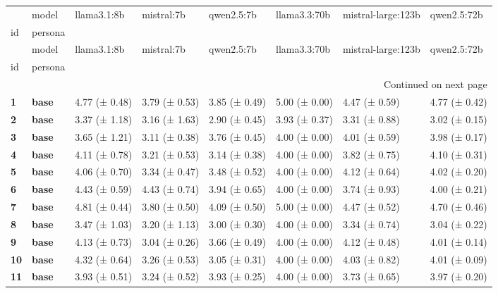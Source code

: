 \begin{longtable}{llllllll}
\toprule
 & model & llama3.1:8b & mistral:7b & qwen2.5:7b & llama3.3:70b & mistral-large:123b & qwen2.5:72b \\
id & persona &  &  &  &  &  &  \\
\midrule
\endfirsthead
\toprule
 & model & llama3.1:8b & mistral:7b & qwen2.5:7b & llama3.3:70b & mistral-large:123b & qwen2.5:72b \\
id & persona &  &  &  &  &  &  \\
\midrule
\endhead
\midrule
\multicolumn{8}{r}{Continued on next page} \\
\midrule
\endfoot
\bottomrule
\endlastfoot
\textbf{1} & \textbf{base} & 4.77 (± 0.48) & 3.79 (± 0.53) & 3.85 (± 0.49) & 5.00 (± 0.00) & 4.47 (± 0.59) & 4.77 (± 0.42) \\
\cline{1-8}
\textbf{2} & \textbf{base} & 3.37 (± 1.18) & 3.16 (± 1.63) & 2.90 (± 0.45) & 3.93 (± 0.37) & 3.31 (± 0.88) & 3.02 (± 0.15) \\
\cline{1-8}
\textbf{3} & \textbf{base} & 3.65 (± 1.21) & 3.11 (± 0.38) & 3.76 (± 0.45) & 4.00 (± 0.00) & 4.01 (± 0.59) & 3.98 (± 0.17) \\
\cline{1-8}
\textbf{4} & \textbf{base} & 4.11 (± 0.78) & 3.21 (± 0.53) & 3.14 (± 0.38) & 4.00 (± 0.00) & 3.82 (± 0.75) & 4.10 (± 0.31) \\
\cline{1-8}
\textbf{5} & \textbf{base} & 4.06 (± 0.70) & 3.34 (± 0.47) & 3.48 (± 0.52) & 4.00 (± 0.00) & 4.12 (± 0.64) & 4.02 (± 0.20) \\
\cline{1-8}
\textbf{6} & \textbf{base} & 4.43 (± 0.59) & 4.43 (± 0.74) & 3.94 (± 0.65) & 4.00 (± 0.00) & 3.74 (± 0.93) & 4.00 (± 0.21) \\
\cline{1-8}
\textbf{7} & \textbf{base} & 4.81 (± 0.44) & 3.80 (± 0.50) & 4.09 (± 0.50) & 5.00 (± 0.00) & 4.47 (± 0.52) & 4.70 (± 0.46) \\
\cline{1-8}
\textbf{8} & \textbf{base} & 3.47 (± 1.03) & 3.20 (± 1.13) & 3.00 (± 0.30) & 4.00 (± 0.00) & 3.34 (± 0.74) & 3.04 (± 0.22) \\
\cline{1-8}
\textbf{9} & \textbf{base} & 4.13 (± 0.73) & 3.04 (± 0.26) & 3.66 (± 0.49) & 4.00 (± 0.00) & 4.12 (± 0.48) & 4.01 (± 0.14) \\
\cline{1-8}
\textbf{10} & \textbf{base} & 4.32 (± 0.64) & 3.26 (± 0.53) & 3.05 (± 0.31) & 4.00 (± 0.00) & 4.03 (± 0.82) & 4.01 (± 0.09) \\
\cline{1-8}
\textbf{11} & \textbf{base} & 3.93 (± 0.51) & 3.24 (± 0.52) & 3.93 (± 0.25) & 4.00 (± 0.00) & 3.73 (± 0.65) & 3.97 (± 0.20) \\

\end{longtable}
